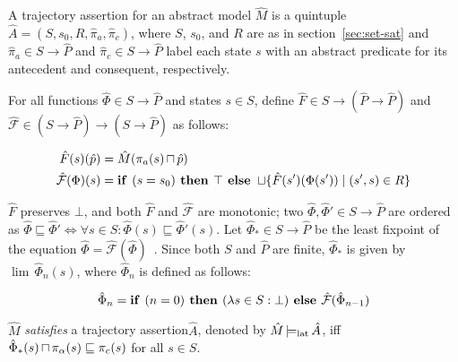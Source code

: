 A trajectory assertion for an abstract model $\hat M$ is a quintuple $\hat A = (S, s_{0}, R, \hat{\pi}_{a}, \hat{\pi}_{c})$, where $S$, $s_{0}$, and $R$ are as in section~\ref{sec:set-sat} and $\hat{\pi}_{a} \in S \rightarrow \hat P$ and $\hat{\pi}_{c} \in S \rightarrow \hat P$ label each state $s$ with an abstract predicate for its antecedent and consequent, respectively.

 For all functions $\hat \Phi \in S \rightarrow \hat P$ and states $s \in S$, define $\hat F \in S \rightarrow (\hat P \rightarrow \hat P)$ and $\hat{\mathcal{F}} \in (S \rightarrow \hat P) \rightarrow (S \rightarrow \hat P)$ as follows:

\begin{align}
\hat F(s)(\hat p) &= \hat M(\pi_{a}(s) \operatorname{\sqcap} \hat p) \\
\hat{\mathcal{F}}(\Phi)(s) &= \textrm{\textbf{if }} (s = s_{0}) \textrm{\textbf{ then }} \top \textrm{\textbf{ else }} \operatorname{\sqcup} \{ \hat F(s')(\Phi(s')) \mid (s',s) \in R \}
\end{align}

\noindent $\hat F$ preserves $\bot$, and both $\hat F$ and $\hat{\mathcal{F}}$ are monotonic; two $\hat \Phi, \hat \Phi' \in S \rightarrow \hat P$ are ordered as $\hat \Phi \sqsubseteq \hat \Phi' \iff \forall s \in S : \hat \Phi(s) \sqsubseteq \hat \Phi'(s)$. Let $\hat \Phi_{*} \in S \rightarrow \hat P$ be the least fixpoint of the equation $\hat \Phi = \hat{\mathcal{F}}(\hat \Phi)$~\cite{davey2002}. Since both $S$ and $\hat P$ are finite, $\hat \Phi_{*}$ is given by $\lim \, \hat \Phi_{n}(s)$, where $\hat \Phi_{n}$ is defined as follows:

\begin{equation}
\hat \Phi_{n} = \textrm{\textbf{if }} (n = 0) \textrm{\textbf{ then }} (\lambda s \in S : \bot) \textrm{\textbf{ else }} \hat{\mathcal{F}}(\hat \Phi_{n-1})
\end{equation}

$\hat M$ \textit{satisfies} a trajectory assertion\footnotemark $\hat A$, denoted by $\hat M \operatorname{\models_{\textrm{lat}}} \hat A$, iff $\hat \Phi_{*}(s) \operatorname{\sqcap} \pi_{\alpha}(s) \sqsubseteq \pi_{c}(s)$ for all $s \in S$.


